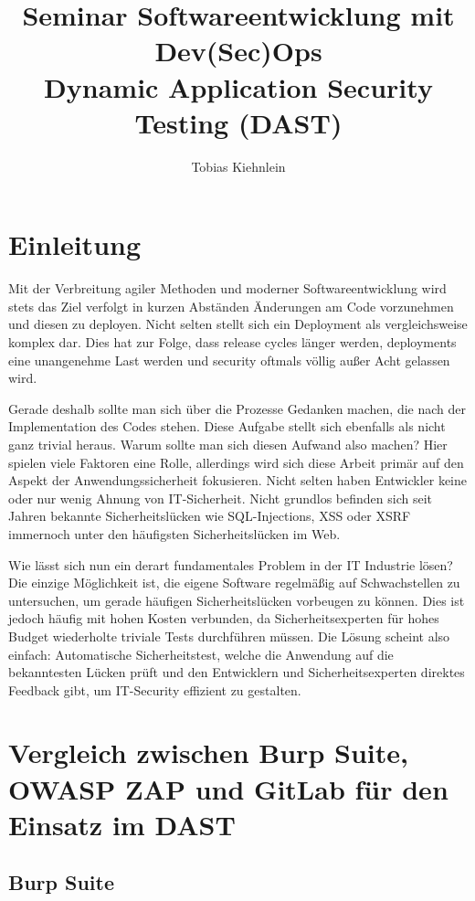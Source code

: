 \documentclass[
    paper=a4, %
    fontsize=10pt,  %
    oneside,        %
    headsepline,    %
    notitlepage     %
]{extarticle}         %
\author{Tobias Kiehnlein}
\title{\textbf{Seminar Softwareentwicklung mit Dev(Sec)Ops}\\\large{Dynamic Application Security Testing (DAST)}}
\date{}
\begin{document}
    \pagestyle{empty}
    \maketitle
    \tableofcontents
    \newpage
    \pagestyle{headings}

    \section{Einleitung}
    Mit der Verbreitung agiler Methoden und moderner Softwareentwicklung wird stets das Ziel verfolgt in kurzen Abständen Änderungen am Code vorzunehmen und diesen zu deployen.
    Nicht selten stellt sich ein Deployment als vergleichsweise komplex dar. Dies hat zur Folge, dass release cycles länger werden, deployments eine unangenehme Last werden und security oftmals völlig außer Acht gelassen wird.

    Gerade deshalb sollte man sich über die Prozesse Gedanken machen, die nach der Implementation des Codes stehen.
    Diese Aufgabe stellt sich ebenfalls als nicht ganz trivial heraus. Warum sollte man sich diesen Aufwand also machen?
    Hier spielen viele Faktoren eine Rolle, allerdings wird sich diese Arbeit primär auf den Aspekt der Anwendungssicherheit fokusieren.
    Nicht selten haben Entwickler keine oder nur wenig Ahnung von IT-Sicherheit.
    Nicht grundlos befinden sich seit Jahren bekannte Sicherheitslücken wie SQL-Injections, XSS oder XSRF immernoch unter den häufigsten Sicherheitslücken im Web.\cite{invicti}

    Wie lässt sich nun ein derart fundamentales Problem in der IT Industrie lösen? Die einzige Möglichkeit ist, die eigene Software regelmäßig auf Schwachstellen zu untersuchen, um gerade häufigen Sicherheitslücken vorbeugen zu können.
    Dies ist jedoch häufig mit hohen Kosten verbunden, da Sicherheitsexperten für hohes Budget wiederholte triviale Tests durchführen müssen.
    Die Lösung scheint also einfach: Automatische Sicherheitstest, welche die Anwendung auf die bekanntesten Lücken prüft und den Entwicklern und Sicherheitsexperten direktes Feedback gibt, um IT-Security effizient zu gestalten.
    \section{Vergleich zwischen Burp Suite, OWASP ZAP und GitLab für den Einsatz im DAST}\label{sec:vergleich-zwischen-burp-suite-owasp-zap-und-gitlab-für-den-einsatz-im-dast}

    \subsection{Burp Suite}
\end{document}
